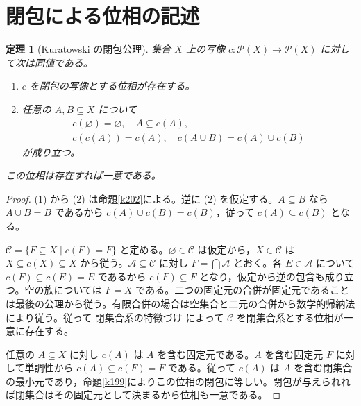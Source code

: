 \documentclass[a5paper,10pt,dvipdfmx]{jsarticle}
\theoremstyle{definition}
\theoremstyle{plain}
\newtheorem{thm}[ruledef]{定理}
\newcommand{\Pow}{\mathcal{P}}
\newcommand{\GenronRefText}[2]{#2}
\begin{document}
\section{閉包による位相の記述}
\begin{thm}[Kuratowski の閉包公理]\label{k207}
集合 $X$ 上の写像 $c:\Pow(X)\to\Pow(X)$ に対して次は同値である。
\begin{enumerate}
\item $c$ を閉包の写像とする位相が存在する。
\item 任意の $A,B\subseteq X$ について
\begin{gather*}
 c(\varnothing)=\varnothing,\quad A\subseteq c(A),\\
 c(c(A))=c(A),\quad c(A\cup B)=c(A)\cup c(B)
\end{gather*}
が成り立つ。
\end{enumerate}
この位相は存在すれば一意である。
\end{thm}
\begin{proof}
(1) から (2) は命題\ref{k202}による。逆に (2) を仮定する。$A\subseteq B$ なら $A\cup B=B$ であるから $c(A)\cup c(B)=c(B)$，従って $c(A)\subseteq c(B)$ となる。

$\mathcal C=\{F\subseteq X\mid c(F)=F\}$ と定める。$\varnothing\in\mathcal C$ は仮定から，$X\in\mathcal C$ は $X\subseteq c(X)\subseteq X$ から従う。$\mathcal A\subseteq\mathcal C$ に対し $F=\bigcap\mathcal A$ とおく。各 $E\in\mathcal A$ について $c(F)\subseteq c(E)=E$ であるから $c(F)\subseteq F$ となり，仮定から逆の包含も成り立つ。空の族については $F=X$ である。二つの固定元の合併が固定元であることは最後の公理から従う。有限合併の場合は空集合と二元の合併から数学的帰納法により従う。従って \GenronRefText{K-000149}{閉集合系の特徴づけ} によって $\mathcal C$ を閉集合系とする位相が一意に存在する。

任意の $A\subseteq X$ に対し $c(A)$ は $A$ を含む固定元である。$A$ を含む固定元 $F$ に対して単調性から $c(A)\subseteq c(F)=F$ である。従って $c(A)$ は $A$ を含む閉集合の最小元であり，命題\ref{k199}によりこの位相の閉包に等しい。閉包が与えられれば閉集合はその固定元として決まるから位相も一意である。
\end{proof}
\par\medskip{}
\end{document}
